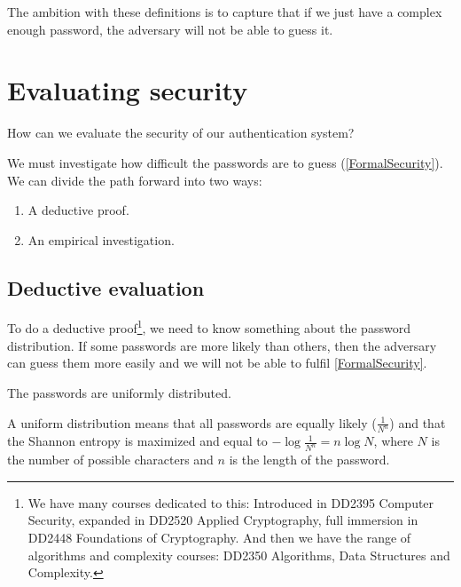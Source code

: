 The ambition with these definitions is to capture that if we just have a 
complex enough password, the adversary will not be able to guess it.


\section{Evaluating security}

\begin{frame}
  \begin{exercise}
    How can we evaluate the security of our authentication system?
  \end{exercise}
\end{frame}

\begin{frame}
  \begin{solution}
    We must investigate how difficult the passwords are to guess 
    (\cref{FormalSecurity}).
    We can divide the path forward into two ways:
    \begin{enumerate}
      \item A deductive proof.
      \item An empirical investigation.
    \end{enumerate}
  \end{solution}
\end{frame}

\subsection{Deductive evaluation}

To do a deductive proof\footnote{%
  We have many courses dedicated to this:
  Introduced in DD2395 Computer Security,
  expanded in DD2520 Applied Cryptography,
  full immersion in DD2448 Foundations of Cryptography.
  And then we have the range of algorithms and complexity courses:
  \eg DD2350 Algorithms, Data Structures and Complexity.
}, we need to know something about the password distribution.
If some passwords are more likely than others, then the adversary can guess 
them more easily and we will not be able to fulfil \cref{FormalSecurity}.

\begin{frame}
  \begin{assumption}\label{AssumeUniform}
    The passwords are uniformly distributed.
  \end{assumption}
\end{frame}

A uniform distribution means that
all passwords are equally likely (\(\frac{1}{N^n}\))
and that
the Shannon entropy is maximized and equal to \(-\log \frac{1}{N^n} = n \log 
{N}\),
where \(N\) is the number of possible characters and \(n\) is the length of the 
password.

